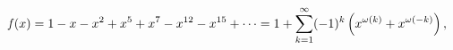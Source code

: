 \[\mathop{\mathit{f}\/}\nolimits\!\left(x\right)=1-x-x^{2}+x^{5}+x^{7}-x^{12}-x^%
{15}+\dots=1+\sum_{k=1}^{\infty}(-1)^{k}\left(x^{\omega(k)}+x^{\omega(-k)}%
\right),\]